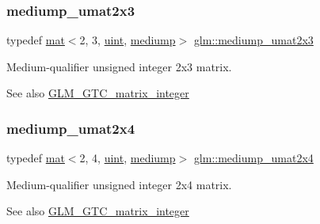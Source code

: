 \subsubsection{\texorpdfstring{mediump\+\_\+umat2x3}{mediump\_umat2x3}}
{\footnotesize\ttfamily typedef \mbox{\hyperlink{structglm_1_1mat}{mat}}$<$2, 3, \mbox{\hyperlink{group__core__precision_ga4fd29415871152bfb5abd588334147c8}{uint}}, \mbox{\hyperlink{namespaceglm_a36ed105b07c7746804d7fdc7cc90ff25a6416f3ea0c9025fb21ed50c4d6620482}{mediump}}$>$ \mbox{\hyperlink{group__gtc__matrix__integer_ga15d2790e10b27b145cd748abffde8968}{glm\+::mediump\+\_\+umat2x3}}}

Medium-\/qualifier unsigned integer 2x3 matrix. \begin{DoxySeeAlso}{See also}
\mbox{\hyperlink{group__gtc__matrix__integer}{G\+L\+M\+\_\+\+G\+T\+C\+\_\+matrix\+\_\+integer}} 
\end{DoxySeeAlso}
\mbox{\label{group__gtc__matrix__integer_gae060f3b73abab278da912329a0a221bc}} 
\subsubsection{\texorpdfstring{mediump\+\_\+umat2x4}{mediump\_umat2x4}}
{\footnotesize\ttfamily typedef \mbox{\hyperlink{structglm_1_1mat}{mat}}$<$2, 4, \mbox{\hyperlink{group__core__precision_ga4fd29415871152bfb5abd588334147c8}{uint}}, \mbox{\hyperlink{namespaceglm_a36ed105b07c7746804d7fdc7cc90ff25a6416f3ea0c9025fb21ed50c4d6620482}{mediump}}$>$ \mbox{\hyperlink{group__gtc__matrix__integer_gae060f3b73abab278da912329a0a221bc}{glm\+::mediump\+\_\+umat2x4}}}

Medium-\/qualifier unsigned integer 2x4 matrix. \begin{DoxySeeAlso}{See also}
\mbox{\hyperlink{group__gtc__matrix__integer}{G\+L\+M\+\_\+\+G\+T\+C\+\_\+matrix\+\_\+integer}} 
\end{DoxySeeAlso}
\mbox{\label{group__gtc__matrix__integer_gaa677ebd95702fc95054de7a4fb4c907f}} 
